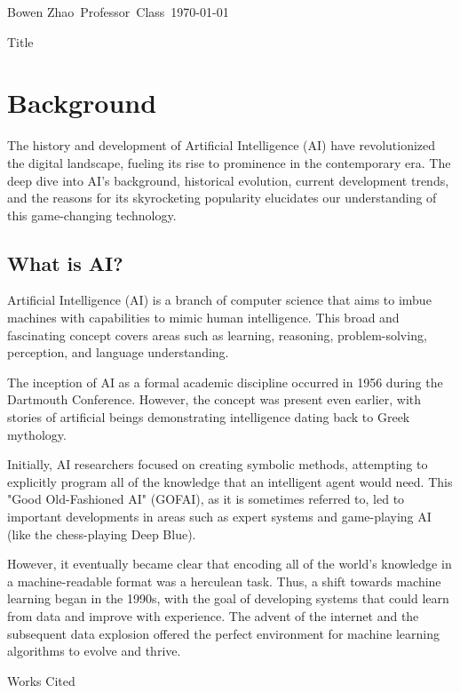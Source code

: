 \documentclass[12pt]{article}
\newenvironment{workscited}{\begin{center} Works Cited \end{center}}{\newpage }
\begin{document}
\begin{flushleft}

Bowen Zhao\
Professor\
Class\
\today\

\begin{center}
Title
\end{center}

\tableofcontents
\clearpage
\section{Background}
The history and development of Artificial Intelligence (AI) have revolutionized the digital landscape, fueling its rise to prominence in the contemporary era. The deep dive into AI's background, historical evolution, current development trends, and the reasons for its skyrocketing popularity elucidates our understanding of this game-changing technology.

\subsection{What is AI?}
Artificial Intelligence (AI) is a branch of computer science that aims to imbue machines with capabilities to mimic human intelligence. This broad and fascinating concept covers areas such as learning, reasoning, problem-solving, perception, and language understanding.

The inception of AI as a formal academic discipline occurred in 1956 during the Dartmouth Conference. However, the concept was present even earlier, with stories of artificial beings demonstrating intelligence dating back to Greek mythology.

Initially, AI researchers focused on creating symbolic methods, attempting to explicitly program all of the knowledge that an intelligent agent would need. This "Good Old-Fashioned AI" (GOFAI), as it is sometimes referred to, led to important developments in areas such as expert systems and game-playing AI (like the chess-playing Deep Blue).

However, it eventually became clear that encoding all of the world's knowledge in a machine-readable format was a herculean task. Thus, a shift towards machine learning began in the 1990s, with the goal of developing systems that could learn from data and improve with experience. The advent of the internet and the subsequent data explosion offered the perfect environment for machine learning algorithms to evolve and thrive.
\begin{workscited}


\end{workscited}

\end{flushleft}
\end{document}

